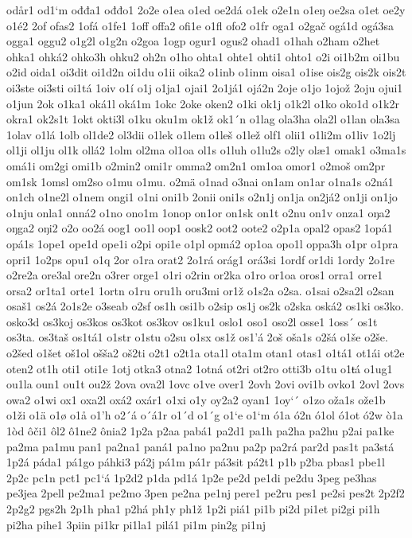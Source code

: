 odår1
od1`m
ođđa1
ođđo1
2o2e
o1ea
o1ed
oe2dá
o1ek
o2e1n
o1eŋ
oe2sa
o1et
oe2y
o1é2
2of
ofas2
1ofá
o1fe1
1off
offa2
ofi1e
o1fl
ofo2
o1fr
oga1
o2gač
ogá1d
ogá3sa
ogga1
oggu2
o1g2l
o1g2n
o2goa
1ogp
ogur1
ogus2
ohad1
o1hah
o2ham
o2het
ohka1
ohká2
ohko3h
ohku2
oh2n
o1ho
ohta1
ohte1
ohti1
ohto1
o2i
oi1b2m
oi1bu
o2id
oida1
oi3dit
oi1d2n
oi1du
o1ii
oika2
o1inb
o1inm
oisa1
o1ise
ois2g
ois2k
ois2t
oi3ste
oi3sti
oi1tá
1oiv
o1í
o1j
o1ja1
ojai1
2o1já1
ojá2n
2oje
o1jo
1ojož
2oju
ojui1
o1jun
2ok
o1ka1
oká1l
oká1m
1okc
2oke
oken2
o1ki
ok1j
o1k2l
o1ko
oko1d
o1k2r
okra1
ok2s1t
1okt
okti3l
o1ku
oku1m
ok1ž
ok1´n
o1lag
ola3ha
ola2l
o1lan
ola3sa
1olav
o1lá
1olb
ol1de2
ol3dii
o1lek
o1lem
o1leš
o1lež
olf1
olii1
o1li2m
o1liv
1o2lj
ol1ji
ol1ju
ol1k
ollá2
1olm
ol2ma
ol1oa
ol1s
o1luh
o1lu2s
o2ly
olæ1
omak1
o3ma1s
omá1i
om2gi
omi1b
o2min2
omi1r
omma2
om2n1
om1oa
omor1
o2moš
om2pr
om1sk
1omsl
om2so
o1mu
o1mu.
o2mä
o1nad
o3nai
on1am
on1ar
o1na1s
o2ná1
on1ch
o1ne2l
o1nem
ongi1
o1ni
oni1b
2onii
oni1s
o2n1j
on1ja
on2já2
on1ji
on1jo
o1nju
onla1
onná2
o1no
ono1m
1onop
on1or
on1sk
on1t
o2nu
on1v
onza1
oŋa2
oŋga2
oŋi2
o2o
oo2á
oog1
oo1l
oop1
oosk2
oot2
oote2
o2p1a
opal2
opas2
1opá1
opá1s
1ope1
ope1d
ope1i
o2pi
opi1e
o1pl
opmá2
op1oa
opo1l
oppa3h
o1pr
o1pra
opri1
1o2ps
opu1
o1q
2or
o1ra
orat2
2o1rá
orág1
orá3si
1ordf
or1di
1ordy
2o1re
o2re2a
ore3al
ore2n
o3rer
orge1
o1ri
o2rin
or2ka
o1ro
or1oa
oros1
orra1
orre1
orsa2
or1ta1
orte1
1ortn
o1ru
oru1h
oru3mi
or1ž
o1s2a
o2sa.
o1sai
o2sa2l
o2san
osaš1
os2á
2o1s2e
o3seab
o2sf
os1h
osi1b
o2sip
os1j
os2k
o2ska
oská2
os1ki
os3ko.
osko3d
os3koj
os3kos
os3kot
os3kov
os1ku1
oslo1
oso1
oso2l
osse1
1oss´
os1t
os3ta.
os3taš
os1tá1
o1str
o1stu
o2su
o1sx
os1ž
os1'á
2oš
oša1s
o2šá
o1še
o2še.
o2šed
o1šet
oš1ol
ošša2
oš2ti
o2t1
o2t1a
ota1l
ota1m
otan1
otas1
o1tá1
ot1ái
ot2e
oten2
ot1h
oti1
oti1e
1otj
otka3
otna2
1otná
ot2ri
ot2ro
otti3b
o1tu
o1ŧá
o1ug1
ou1la
oun1
ou1t
ou2ž
2ova
ova2l
1ovc
o1ve
over1
2ovh
2ovi
ovi1b
ovko1
2ovl
2ovs
owa2
o1wi
ox1
oxa2l
oxá2
oxár1
o1xi
o1y
oy2a2
oyan1
1oy`´
o1zo
oža1s
ože1b
o1ži
o1ä
o1ø
o1å
o1'h
o2´á
o´á1r
o1´d
o1´g
o1`e
o1`m
ó1a
ó2n
ó1ol
ó1ot
ó2w
ò1a
1òd
ôči1
ôl2
ô1ne2
ônia2
1p2a
p2aa
pabá1
pa2d1
pa1h
pa2ha
pa2hu
p2ai
pa1ke
pa2ma
pa1mu
pan1
pa2na1
paná1
pa1no
pa2nu
pa2p
pa2rá
par2d
pas1t
pa3stá
1p2á
páda1
pá1go
páhki3
pá2j
pá1m
pá1r
pá3sit
pá2t1
p1b
p2ba
pbas1
pbe1l
2p2c
pc1n
pct1
pc1`á
1p2d2
p1da
pd1á
1p2e
pe2d
pe1di
pe2du
3peg
pe3has
pe3jea
2pell
pe2ma1
pe2mo
3pen
pe2na
pe1nj
pere1
pe2ru
pes1
pe2si
pes2t
2p2f2
2p2g2
pgs2h
2p1h
pha1
p2há
ph1y
ph1ž
1p2i
piá1
pi1b
pi2d
pi1et
pi2gi
pi1h
pi2ha
pihe1
3piin
pi1kr
pi1la1
pilá1
pi1m
pin2g
pi1nj
